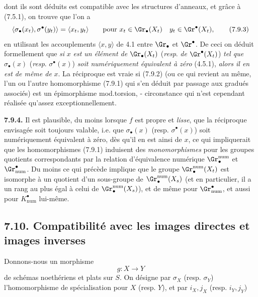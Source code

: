 
dont ils sont déduits est compatible avec les structures d'anneaux, et grâce à (7.5.1), on trouve que l'on a
\[
  \langle\sigma_\bullet(x_t),\sigma^\bullet(y_t)\rangle
  =
  \langle x_t,y_t\rangle
  \qquad\text{pour }
  x_t\in\Gr_\bullet(X_t)\quad y_t\in\Gr^\bullet(X_t),
\tag{7.9.3}
\]
en utilisant les accouplements \(\langle x,y\rangle\) de 4.1 entre \(\Gr_\bullet\) et \(\Gr^\bullet\). De ceci on déduit formellement que \emph{si} \(x\) \emph{est un élément de} \(\Gr_\bullet(X_t)\) (\emph{resp}. \emph{de} \(\Gr^\bullet(X_t)\)) \emph{tel que} \(\sigma_\bullet(x)\) (\emph{resp}. \(\sigma^\bullet(x)\)) \emph{soit numériquement équivalent à zéro} (4.5.1), \emph{alors il en est de même de} \(x\). La réciproque est vraie si (7.9.2) (ou ce qui revient au même, l'un ou l'autre homomorphisme (7.9.1) qui s'en déduit par passage aux gradués associés) est un épimorphisme mod.torsion, - circonstance qui n'est cependant réalisée qu'assez exceptionnellement.

\textbf{7.9.4.} Il est plausible, du moins lorsque \(f\) est propre et \emph{lisse}, que la réciproque envisagée soit toujours valable, i.e. que \(\sigma_\bullet(x)\) (resp. \(\sigma^\bullet(x)\)) soit numériquement équivalent à zéro, dès qu'il en est ainsi de \(x\), ce qui impliquerait que les homomorphismes (7.9.1) induisent des \emph{monomorphismes} pour les groupes quotients correspondants par la relation d'équivalence numérique \(\Gr^{\mathrm{num}}_\bullet\) et \(\Gr_{\mathrm{num}}^\bullet\). Du moins ce qui précède implique que le groupe \(\Gr_\bullet^{\mathrm{num}}(X_t)\) est isomorphe à un quotient d'un sous-groupe de \(\Gr_\bullet^{\mathrm{num}}(X_s)\) (et en particulier, il a un rang au plus égal à celui de \(\Gr_\bullet^{\mathrm{num}}(X_s)\)), et de même pour \(\Gr_{\mathrm{num}}^\bullet\), et aussi pour \(K^\bullet_{\mathrm{num}}\) lui-même.

\subsection*{7.10. Compatibilité avec les images directes et images inverses}
Donnons-nous un morphisme
\[
  g:X\longrightarrow Y
\]
de schémas noethériens et plats sur \(S\). On désigne par \(\sigma_X\) (resp. \(\sigma_Y\)) l'homomorphisme de spécialisation pour \(X\) (resp. \(Y\)), et par \(i_X,j_X\) (resp. \(i_Y,j_Y\))
